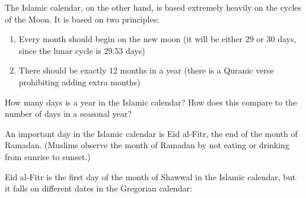 \documentclass[11pt]{article}
\begin{document}
The Islamic calendar, on the other hand, is based extremely heavily on the cycles of the Moon. It is based on two principles:

\begin{enumerate}
	\item Every month should begin on the new moon (it will be either 29 or 30 days, since the lunar cycle is 29.53 days)
	\item There should be exactly 12 months in a year (there is a Quranic verse prohibiting adding extra months)
\end{enumerate}

How many days is a year in the Islamic calendar? How does this compare to the number of days in a seasonal year?

\vspace{1in}
\underline{\hspace{6in}}

An important day in the Islamic calendar is Eid al-Fitr, the end of the month of Ramadan. (Muslims observe the month of Ramadan by not eating or drinking from sunrise to sunset.)

Eid al-Fitr is the first day of the month of Shawwal in the Islamic calendar, but it falls on different dates in the Gregorian calendar:
\end{document}
